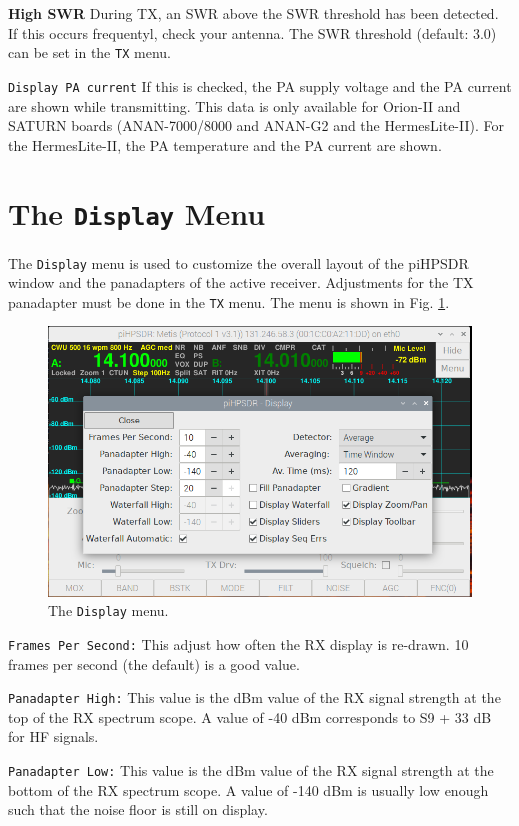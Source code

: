\documentclass[12pt]{book}
\def\rett#1{\texttt{\color{red}#1}}
\def\bltt#1{\texttt{\color{blue}#1}}
\begin{document}
\textbf{High SWR} During TX, an SWR above the SWR threshold has been detected. If this occurs
frequentyl, check your antenna. The SWR threshold (default: 3.0) can be set in the
\bltt{TX} menu.

\rett{Display PA current} If this is checked, the PA supply voltage and the PA current
are shown while transmitting. This data is only available for Orion-II and SATURN boards
(ANAN-7000/8000 and ANAN-G2 and the HermesLite-II).
 For the HermesLite-II, the PA temperature and the PA current are shown.
\section{The \texttt{Display} Menu}

The \bltt{Display} menu is used to customize the overall layout of the piHPSDR
window and the panadapters of the active receiver. Adjustments
for the TX panadapter must be done in the \bltt{TX} menu. The menu is shown
in Fig. \ref{fig:DisplayMenu}.

\begin{figure}[ht]
\center
\includegraphics[width=12cm]{DisplayMenu.png}
\caption{The \bltt{Display} menu.}
\label{fig:DisplayMenu}
\end{figure}

\rett{Frames Per Second:} This adjust how often the RX display is re-drawn.
10 frames per second (the default) is a good value.

\rett{Panadapter High:} This value is the dBm value of the RX signal strength at the
top of the RX spectrum scope. A value of -40 dBm corresponds to S9 + 33 dB for HF
signals.

\rett{Panadapter Low:} This value is the dBm value of the RX signal strength at the
bottom of the RX spectrum scope. A value of -140 dBm is usually low enough such that
the noise floor is still on display.
\end{document}
